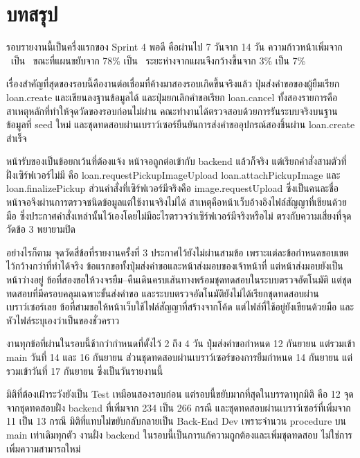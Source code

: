 \section{บทสรุป}

รอบรายงานนี้เป็นครึ่งแรกของ Sprint 4 พอดี คือผ่านไป 7 วันจาก 14 วัน ความก้าวหน้าเพิ่มจาก \prevactualpct\ เป็น \actualpct\ ขณะที่แผนขยับจาก 78\% เป็น \planpct\ ระยะห่างจากแผนจึงกว้างขึ้นจาก 3\% เป็น 7\%

เรื่องสำคัญที่สุดของรอบนี้คืองานต่อเชื่อมที่ค้างมาสองรอบเกิดขึ้นจริงแล้ว ปุ่มส่งคำขอของผู้ยืมเรียก loan.create และเขียนลงฐานข้อมูลได้ และปุ่มยกเลิกคำขอเรียก loan.cancel ทั้งสองรายการคือสาเหตุหลักที่ทำให้จุดวัดของรอบก่อนไม่ผ่าน คณะทำงานได้ตรวจสอบด้วยการรันระบบจริงบนฐานข้อมูลที่ seed ใหม่ และชุดทดสอบผ่านเบราว์เซอร์ยืนยันการส่งคำขออุปกรณ์สองชิ้นผ่าน loan.create สำเร็จ

หน้ารับของเป็นข้อยกเว้นที่ต้องแจ้ง หน้าจอถูกต่อเข้ากับ backend แล้วก็จริง แต่เรียกคำสั่งสามตัวที่ฝั่งเซิร์ฟเวอร์ไม่มี คือ loan.requestPickupImageUpload loan.attachPickupImage และ loan.finalizePickup ส่วนคำสั่งที่เซิร์ฟเวอร์มีจริงคือ image.requestUpload ซึ่งเป็นคนละชื่อ หน้าจอจึงผ่านการตรวจชนิดข้อมูลแต่ใช้งานจริงไม่ได้ สาเหตุคือหน้าเว็บอ้างอิงไฟล์สัญญาที่เขียนด้วยมือ ซึ่งประกาศคำสั่งเหล่านั้นไว้เองโดยไม่มีอะไรตรวจว่าเซิร์ฟเวอร์มีจริงหรือไม่ ตรงกับความเสี่ยงที่จุดวัดข้อ 3 พยายามปิด

อย่างไรก็ตาม จุดวัดสี่ข้อที่รายงานครั้งที่ 3 ประกาศไว้ยังไม่ผ่านสามข้อ เพราะแต่ละข้อกำหนดขอบเขตไว้กว้างกว่าที่ทำได้จริง ข้อแรกขอทั้งปุ่มส่งคำขอและหน้าส่งมอบของเจ้าหน้าที่ แต่หน้าส่งมอบยังเป็นหน้าว่างอยู่ ข้อที่สองขอให้วงจรยืม–คืนเดินครบเส้นทางพร้อมชุดทดสอบในระบบตรวจอัตโนมัติ แต่ชุดทดสอบที่มีครอบคลุมเฉพาะขั้นส่งคำขอ และระบบตรวจอัตโนมัติยังไม่ได้เรียกชุดทดสอบผ่านเบราว์เซอร์เลย ข้อที่สามขอให้หน้าเว็บใช้ไฟล์สัญญาที่สร้างจากโค้ด แต่ไฟล์ที่ใช้อยู่ยังเขียนด้วยมือ และหัวไฟล์ระบุเองว่าเป็นของชั่วคราว

งานทุกข้อที่ผ่านในรอบนี้ช้ากว่ากำหนดที่ตั้งไว้ 2 ถึง 4 วัน ปุ่มส่งคำขอกำหนด 12 กันยายน แต่รวมเข้า main วันที่ 14 และ 16 กันยายน ส่วนชุดทดสอบผ่านเบราว์เซอร์ของการยืมกำหนด 14 กันยายน แต่รวมเข้าวันที่ 17 กันยายน ซึ่งเป็นวันรายงานนี้

มิติที่ต้องเฝ้าระวังยังเป็น Test เหมือนสองรอบก่อน แต่รอบนี้ขยับมากที่สุดในบรรดาทุกมิติ คือ 12 จุด จากชุดทดสอบฝั่ง backend ที่เพิ่มจาก 234 เป็น 266 กรณี และชุดทดสอบผ่านเบราว์เซอร์ที่เพิ่มจาก 11 เป็น 13 กรณี มิติที่แทบไม่ขยับกลับกลายเป็น Back-End Dev เพราะจำนวน procedure บน main เท่าเดิมทุกตัว งานฝั่ง backend ในรอบนี้เป็นการแก้ความถูกต้องและเพิ่มชุดทดสอบ ไม่ใช่การเพิ่มความสามารถใหม่

